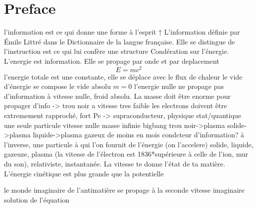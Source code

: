 \thispagestyle{empty}
\cleardoublepage 
\thispagestyle{preface}
\section*{Preface}
	 l'information est ce qui donne une forme à l'esprit
↑ L'information définie par Émile Littré dans le Dictionnaire de la langue française. 
Elle se distingue de l'instruction est ce qui lui confère une structure
	Condération sur l'énergie.
	L'energie est information. Elle se propage par onde et par deplacement
	$$E=mc^2$$
	l'energie totale est une constante, elle se déplace avec le flux de chaleur
	le vide d'énergie se compose le vide absolu $m=0$
	l'energie nulle ne propage pas d'information
	à vitesse nulle, froid absolu. La masse doit être enorme pour propager d'info -> trou noir
	a vitesse tres faible les electrons doivent être extremement rapproché, fort Pe -> supraconducteur, physique stat/quantique
	une seule particule vitesse nulle masse infinie 
	bigbang trou noir->plasma solide->plasma liquide->plasma gazeux de moins en mois condcteur d'information?
	à l'inverse, une particule à qui l'on fournit de l'énergie (on l'accelere) 
	solide, liquide, gazeuze, plasma (la vitesse de l'électron est 1836*supérieure à celle de l'ion, mur du son), 
	relativiste, instantanée. 
	La vitesse te donne l'état de ta matière. L'énergie cinétique est plus grande que la potentielle
	
	le monde imaginaire de l'antimatière se propage à la seconde vitesse imaginaire solution de l'équation
	 